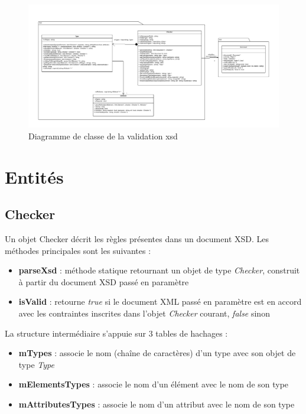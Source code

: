 \begin{landscape}
\begin{figure}[H]
	\centering
	\includegraphics[width=1\linewidth]{images/xsd-uml.pdf}
	\caption{Diagramme de classe de la validation xsd}
	\label{xsdClassDiagram}
\end{figure}
\end{landscape}

\section{Entités}
	\subsection{Checker}
		Un objet Checker décrit les règles présentes dans un document XSD. Les méthodes principales sont les suivantes :
		\begin{itemize}
			\item \textbf{parseXsd} : méthode statique retournant un objet de type \textit{Checker},  construit à partir du document XSD passé en paramètre
			\item \textbf{isValid} : retourne \textit{true} si le document XML passé en paramètre est en accord avec les contraintes inscrites dans l'objet \textit{Checker} courant, \textit{false} sinon
		\end{itemize}

		La structure intermédiaire s'appuie sur 3 tables de hachages :
		\begin{itemize}
			\item \textbf{mTypes} : associe le nom (chaîne de caractères) d'un type avec son objet de type \textit{Type}
			\item \textbf{mElementsTypes} : associe le nom d'un élément avec le nom de son type
			\item \textbf{mAttributesTypes} : associe le nom d'un attribut avec le nom de son type
		\end{itemize}


